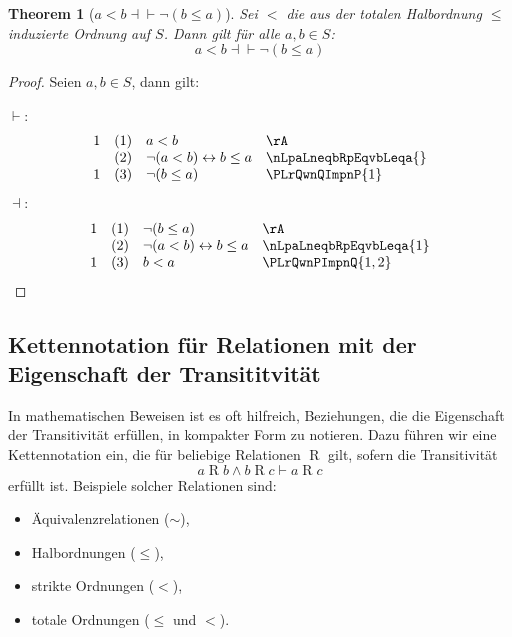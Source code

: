 \documentclass{book}
\theoremstyle{plain}
\newtheorem{theorem}{Theorem}
\theoremstyle{remark}
\theoremstyle{definition}
\begin{document}
\label{aLneqbEqvnLpbLeqaRp}
\begin{theorem}[\(a<b\dashv\vdash \neg(b\leq a)\)]
    Sei \(<\) die aus der totalen Halbordnung \(\leq\) induzierte Ordnung auf \(S\). Dann gilt für alle \(a,b\in S\):
    \[
    a<b\dashv\vdash \neg(b\leq a)
    \]
\end{theorem}
\begin{proof}
        Seien \(a,b\in S\), dann gilt:
        
\(\vdash\):
	\[
        \begin{array}{llll}
          1 & (1) &   a<b  & \rA\\
            & (2) &  \neg(a<b)\leftrightarrow b\leq a  & \nLpaLneqbRpEqvbLeqa{}\\
          1 & (3) &  \neg(b\leq a)  & \PLrQwnQImpnP{1}\\
        \end{array}
	\]
\(\dashv\):
 	\[
        \begin{array}{llll}
            1 & (1) &   \neg(b\leq a)  & \rA\\        
              & (2) &   \neg(a<b)\leftrightarrow b\leq a  &   \nLpaLneqbRpEqvbLeqa{1}   \\
            1 & (3) &   b<a                 &   \PLrQwnPImpnQ{1,2}\\
        \end{array}
	\]
\end{proof}


\subsection{Kettennotation für Relationen mit der Eigenschaft der Transititvität}

In mathematischen Beweisen ist es oft hilfreich, Beziehungen, die die Eigenschaft der Transitivität erfüllen, in kompakter Form zu notieren. Dazu führen wir eine Kettennotation ein, die für beliebige Relationen \(\mathrel{R}\) gilt, sofern die Transitivität 
\[
a \mathrel{R} b \land b \mathrel{R} c \vdash a \mathrel{R} c
\]
erfüllt ist. Beispiele solcher Relationen sind:
\begin{itemize}
    \item Äquivalenzrelationen (\(\sim\)),
    \item Halbordnungen (\(\leq\)),
    \item strikte Ordnungen (\(<\)),
    \item totale Ordnungen (\(\leq\) und \(<\)).
\end{itemize}
\end{document}
